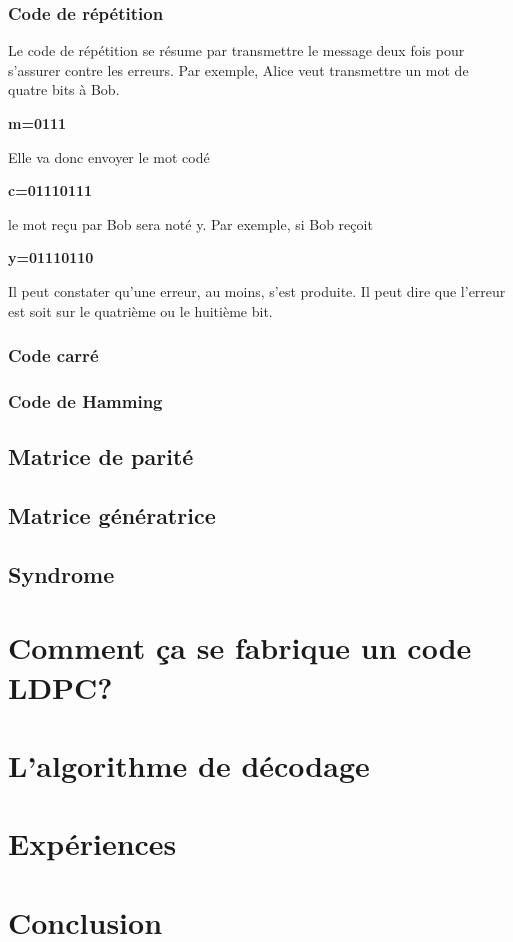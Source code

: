 \documentclass{article}
\begin{document}
\subsubsection{Code de répétition}
Le code de répétition se résume par transmettre le message deux fois pour s'assurer contre les erreurs. Par exemple, Alice veut transmettre un mot de quatre bits à Bob. 
\begin{tabbing}
\hspace{5cm}\textbf{m=0111} \newline
\end{tabbing}
Elle va donc envoyer le mot codé
\begin{tabbing}
    \hspace{5cm}\textbf{c=01110111}
\end{tabbing}
le mot reçu par Bob sera noté y. Par exemple, si Bob reçoit
\begin{tabbing}
    \hspace{5cm}\textbf{y=01110110}
\end{tabbing}
Il peut constater qu'une erreur, au moins, s'est produite. Il peut dire que l'erreur est soit sur le quatrième ou le huitième bit.
\subsubsection{Code carré}
\subsubsection{Code de Hamming}
\subsection{Matrice de parité}
\subsection{Matrice génératrice}
\subsection{Syndrome}

\section{Comment ça se fabrique un code LDPC?}
\section{L'algorithme de décodage}
\section{Expériences}
\section{Conclusion}
\end{document}
